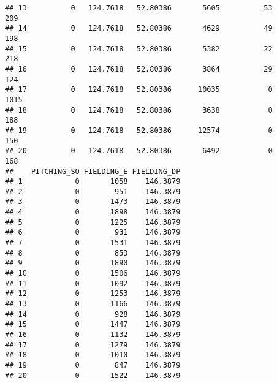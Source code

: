\documentclass[
]{article}
\begin{document}
\begin{verbatim}
## 13          0   124.7618   52.80386       5605          53         209
## 14          0   124.7618   52.80386       4629          49         198
## 15          0   124.7618   52.80386       5382          22         218
## 16          0   124.7618   52.80386       3864          29         124
## 17          0   124.7618   52.80386      10035           0        1015
## 18          0   124.7618   52.80386       3638           0         188
## 19          0   124.7618   52.80386      12574           0         150
## 20          0   124.7618   52.80386       6492           0         168
##    PITCHING_SO FIELDING_E FIELDING_DP
## 1            0       1058    146.3879
## 2            0        951    146.3879
## 3            0       1473    146.3879
## 4            0       1898    146.3879
## 5            0       1225    146.3879
## 6            0        931    146.3879
## 7            0       1531    146.3879
## 8            0        853    146.3879
## 9            0       1890    146.3879
## 10           0       1506    146.3879
## 11           0       1092    146.3879
## 12           0       1253    146.3879
## 13           0       1166    146.3879
## 14           0        928    146.3879
## 15           0       1447    146.3879
## 16           0       1132    146.3879
## 17           0       1279    146.3879
## 18           0       1010    146.3879
## 19           0        847    146.3879
## 20           0       1522    146.3879
\end{verbatim}
\end{document}
